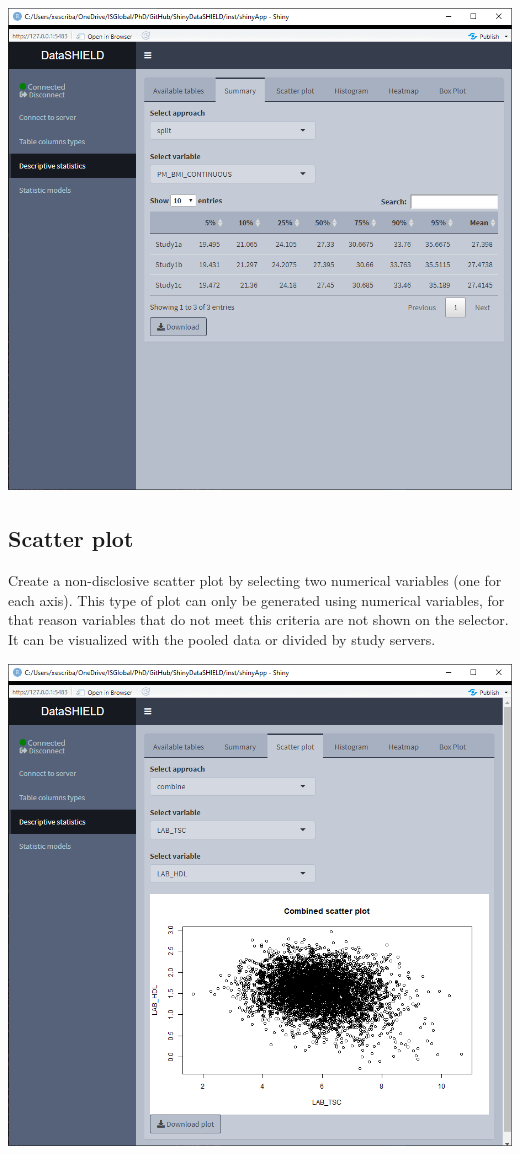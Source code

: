 \documentclass[
]{book}
\begin{document}
\includegraphics{images/descriptive_stats2_2.png}

\hypertarget{scatter-plot}{%
\subsection{Scatter plot}\label{scatter-plot}}

Create a non-disclosive scatter plot by selecting two numerical variables (one for each axis). This type of plot can only be generated using numerical variables, for that reason variables that do not meet this criteria are not shown on the selector. It can be visualized with the pooled data or divided by study servers.

\includegraphics{images/descriptive_stats3.png}
\end{document}
